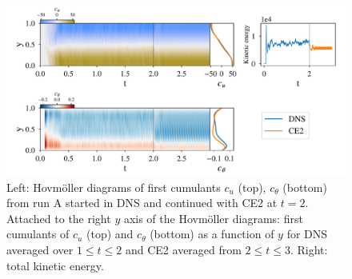 \documentclass{jfm}
\newcommand{\ct}{c_{\theta}}
\newcommand{\cu}{c_u}
\begin{document}
\begin{figure}
  \centering
  \includegraphics[width=\textwidth]{../../figs/run_A_fig.pdf}
  \caption{Left: Hovm\"oller diagrams of first cumulants $\cu$ (top), $c_\theta$ (bottom) from run A started in DNS and continued with CE2 at $t=2$. Attached to the right $y$ axis of the Hovm\"oller diagrams: first cumulants of $\cu$ (top) and $\ct$ (bottom) as a function of $y$ for DNS averaged over $1 \le t \le 2$ and CE2 averaged from $2 \le t \le 3$. Right: total kinetic energy.}
  \label{fig:run_A}
\end{figure}
\end{document}
